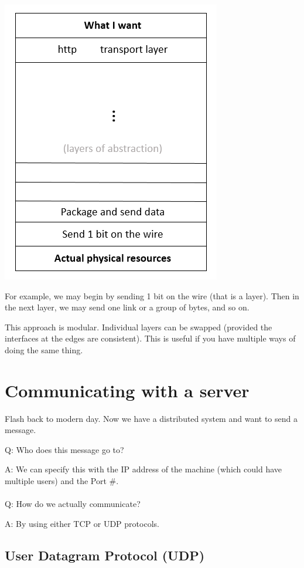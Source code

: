 \documentclass[twoside]{article}
\begin{document}
\includegraphics[scale=0.6]{img2.PNG}

For example, we may begin by sending 1 bit on the wire (that is a layer).  Then in the next layer, we may send one link or a group of bytes, and so on.

This approach is modular.  Individual layers can be swapped (provided the interfaces at the edges are consistent).  This is useful if you have multiple ways of doing the same thing. 


\section{Communicating with a server}

Flash back to modern day.  Now we have a distributed system and want to send a message.

Q: Who does this message go to?

A: We can specify this with the IP address of the machine (which could have multiple users) and the Port \#.
\\ \\
Q: How do we actually communicate?

A: By using either TCP or UDP protocols.

\subsection{User Datagram Protocol (UDP)}
\end{document}
